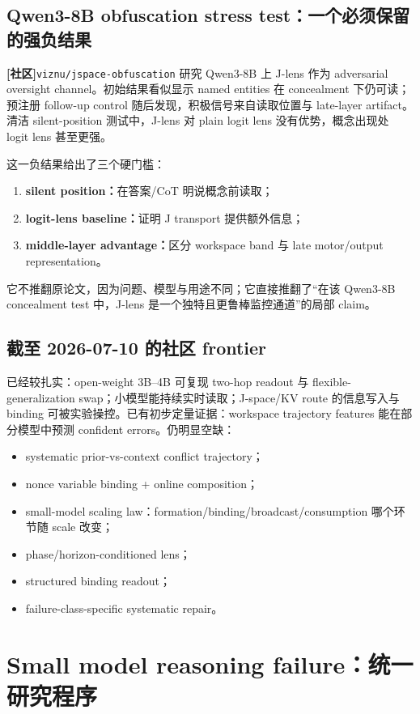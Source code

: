 \documentclass[10.5pt,a4paper]{ctexart}
\newcommand{\Community}{\textbf{[社区]}}
\begin{document}
\subsection{Qwen3-8B obfuscation stress test：一个必须保留的强负结果}
\Community \texttt{viznu/jspace-obfuscation} 研究 Qwen3-8B 上 J-lens 作为 adversarial oversight channel。初始结果看似显示 named entities 在 concealment 下仍可读；预注册 follow-up control 随后发现，积极信号来自读取位置与 late-layer artifact。清洁 silent-position 测试中，J-lens 对 plain logit lens 没有优势，概念出现处 logit lens 甚至更强。

这一负结果给出了三个硬门槛：
\begin{enumerate}
  \item \textbf{silent position：}在答案/CoT 明说概念前读取；
  \item \textbf{logit-lens baseline：}证明 J transport 提供额外信息；
  \item \textbf{middle-layer advantage：}区分 workspace band 与 late motor/output representation。
\end{enumerate}
它不推翻原论文，因为问题、模型与用途不同；它直接推翻了“在该 Qwen3-8B concealment test 中，J-lens 是一个独特且更鲁棒监控通道”的局部 claim。

\subsection{截至 2026-07-10 的社区 frontier}
已经较扎实：open-weight 3B--4B 可复现 two-hop readout 与 flexible-generalization swap；小模型能持续实时读取；J-space/KV route 的信息写入与 binding 可被实验操控。已有初步定量证据：workspace trajectory features 能在部分模型中预测 confident errors。仍明显空缺：
\begin{itemize}
  \item systematic prior-vs-context conflict trajectory；
  \item nonce variable binding + online composition；
  \item small-model scaling law：formation/binding/broadcast/consumption 哪个环节随 scale 改变；
  \item phase/horizon-conditioned lens；
  \item structured binding readout；
  \item failure-class-specific systematic repair。
\end{itemize}

\section{Small model reasoning failure：统一研究程序}
\end{document}
